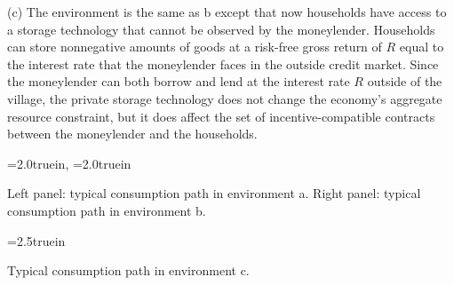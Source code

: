 \item{(c) } The environment is the same as  b except  that now households have access to a storage technology that
cannot be observed by the moneylender.
Households can store nonnegative amounts of goods at a risk-free
gross return of $R$ equal to the interest rate that
the moneylender faces in the outside credit market.
Since the moneylender can both borrow and lend at the interest
rate $R$ outside of the village,
the private storage technology does not change the economy's
aggregate resource constraint, but it does  affect the set of
incentive-compatible contracts between the moneylender and the
households.





\centerline{\epsfxsize=2.0truein, \epsfxsize=2.0truein}
\caption{Left panel: typical consumption path in environment a. Right panel: typical consumption path in environment b.}
\endfigure
\medskip



%

\centerline{\epsfxsize=2.5truein}
\caption{Typical consumption path in environment c.}
\endfigure
\medskip



%


%
%

